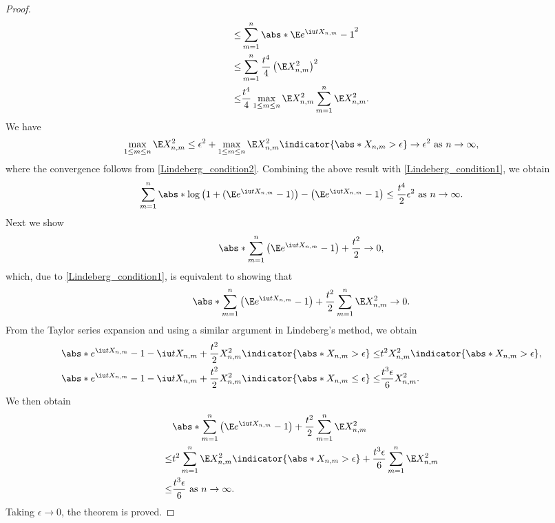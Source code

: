 \documentclass[../aipt.tex]{subfiles}
\begin{document}
\begin{proof}
\begin{align*}
\leq& \sum_{m=1}^n \abs*{\E e^{\iu t X_{n,m}} - 1 }^2  \\
\leq& \sum_{m=1}^n \frac{t^4}{4} \left( \E X_{n,m}^2 \right)^2 \\
\leq& \frac{t^4}{4} \max_{1 \leq m \leq n} \E X_{n,m}^2 \sum_{m=1}^n \E X_{n,m}^2.
\end{align*}
We have
\begin{align*}
\max_{1 \leq m \leq n} \E X_{n,m}^2 
\leq \epsilon^2 + \max_{1 \leq m \leq n} \E X_{n,m}^2 \indicator{\abs*{X_{n,m}} > \epsilon}
\to \epsilon^2 \ \text{as}\ n \to \infty,
\end{align*}
where the convergence follows from \cref{Lindeberg_condition2}. Combining the above result with \cref{Lindeberg_condition1}, we obtain
\begin{align}
\sum_{m=1}^n \abs*{\log \left(1+(\E e^{\iu t X_{n,m}} - 1)\right) - \left( \E e^{\iu t X_{n,m}} - 1 \right)}
\leq 
\frac{t^4}{2}\epsilon^2 \ \text{as}\ n \to \infty. \label{Lindeberg_intmd_ineq4}
\end{align}
Next we show
\begin{align*}
\abs*{\sum_{m=1}^n \left(\E e^{\iu t X_{n,m}} - 1 \right) + \frac{t^2}{2}} \to 0,
\end{align*}
which, due to \cref{Lindeberg_condition1}, is equivalent to showing that
\begin{align*}
\abs*{\sum_{m=1}^n \left(\E e^{\iu t X_{n,m}} - 1 \right) + \frac{t^2}{2} \sum_{m=1}^n \E X_{n,m}^2} \to 0.
\end{align*}
From the Taylor series expansion and using a similar argument in Lindeberg's method, we obtain
\begin{align*}
\abs*{ e^{\iu t X_{n,m}} - 1 - \iu t X_{n,m} + \frac{t^2}{2} X_{n,m}^2} \indicator{\abs*{X_{n,m}} > \epsilon}
\leq& t^2 X_{n,m}^2 \indicator{\abs*{X_{n,m}} > \epsilon}, \\
%
\abs*{ e^{\iu t X_{n,m}} - 1 - \iu t X_{n,m} + \frac{t^2}{2} X_{n,m}^2} \indicator{\abs*{X_{n,m}} \leq \epsilon}
\leq& \frac{t^3 \epsilon}{6} X_{n,m}^2.
\end{align*}
We then obtain
\begin{align*}
&\abs*{\sum_{m=1}^n \left( \E e^{\iu t X_{n,m}} - 1 \right) + \frac{t^2}{2} \sum_{m=1}^n \E X_{n,m}^2} \\
\leq& t^2 \sum_{m=1}^n \E X_{n,m}^2 \indicator{\abs*{X_{n,m}} > \epsilon} + \frac{t^3 \epsilon}{6} \sum_{m=1}^n \E X_{n,m}^2 \\
\leq& \frac{t^3 \epsilon}{6} \ \text{as}\ n \to \infty.
\end{align*}
Taking $\epsilon \to 0$, the theorem is proved.
\end{proof}
\end{document}
